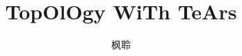 
\usepackage{ctex}
\usepackage{tikz}
\usetikzlibrary{cd}

\usepackage{mathrsfs} %
\usepackage{amsthm}
\usepackage{amsmath}
\usepackage{amssymb}
\usepackage{mathtools}




\usepackage{blindtext}
\usepackage{bm}
\parindent=0pt
\setlength{\parindent}{2em} 
\usepackage{indentfirst}

\usepackage{graphicx} %

\usepackage{xcolor}
\usepackage{titlesec}

\usepackage{tocloft}
\renewcommand{\cftsecfont}{\color{blue}\bfseries\large}
\renewcommand{\cftsubsecfont}{\color{blue}}


\newenvironment{claim}[1]{\par\noindent\underline{Claim:}\space#1}{}

\newcommand*{\xfunc}[4]{{#2}\colon{#3}{#1}{#4}}
\newcommand*{\func}[3]{\xfunc{\to}{#1}{#2}{#3}}
\newcommand\tpl{\mathcal{T}}

\newcommand\Set[2]{\{\,#1\mid#2\,\}} %
\newcommand\SET[2]{\Set{#1}{\text{#2}}} %

\title{TopOlOgy WiTh TeArs}
\author{枫聆}
\maketitle

